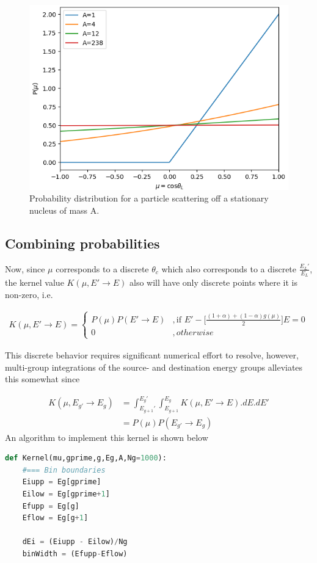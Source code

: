 \documentclass[11pt,letterpaper,titlepage]{article}
\newcommand{\beq}{\begin{equation*}
\begin{aligned}}
\newcommand{\eeq}{\end{aligned}
\end{equation*}}
\numberwithin{equation}{section}
\begin{document}
\begin{appendices}
\begin{figure}[H]
\centering
\includegraphics[width=0.7\linewidth]{Figures/ScatProbvsA}
\caption{Probability distribution for a particle scattering off a stationary nucleus of mass A.}
\label{fig:scatproblevsa}
\end{figure}



\subsection{Combining probabilities}
Now, since $\mu$ corresponds to a discrete $\theta_c$ which also corresponds to a discrete $\frac{E_L'}{E_L}$, the kernel value $K(\mu,E'\to E)$ also will have only discrete points where it is non-zero, i.e.

\beq
K(\mu,E' \to E)=
\begin{cases}
P(\mu)P(E'\to E)    &, \text{if } E' - \biggr[
\frac{  (1+\alpha) + (1-\alpha) g(\mu)   }{2}
\biggr] E = 0 \\
0 &, otherwise
\end{cases}
\eeq 

This discrete behavior requires significant numerical effort to resolve, however, multi-group integrations of the source- and destination energy groups alleviates this somewhat since

\beq 
K(\mu,E_{g'} \to E_g) &=
\int_{E_{g+1}'}^{E_g'} \int_{E_{g+1}}^{E_g} K(\mu,E' \to E).dE.dE' \\
&=P(\mu)P(E_{g'}\to E_g) 
\eeq 
\newline
An algorithm to implement this kernel is shown below
\newpage
\begin{lstlisting}[language=python]
def Kernel(mu,gprime,g,Eg,A,Ng=1000):
    #=== Bin boundaries
    Eiupp = Eg[gprime]
    Eilow = Eg[gprime+1]
    Efupp = Eg[g]
    Eflow = Eg[g+1]
    
    dEi = (Eiupp - Eilow)/Ng
    binWidth = (Efupp-Eflow)
    

\end{lstlisting}
\end{appendices}
\end{document}
